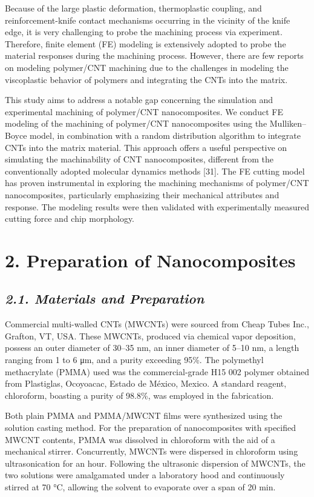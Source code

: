 \documentclass{article}
\begin{document}
Because of the large plastic deformation, thermoplastic coupling, and reinforcement-knife contact mechanisms occurring in the vicinity of the knife edge, it is very challenging to probe the machining process via experiment. Therefore, finite element (FE) modeling is extensively adopted to probe the material responses during the machining process. However, there are few reports on modeling polymer/CNT machining due to the challenges in modeling the viscoplastic behavior of polymers and integrating the CNTs into the matrix.

This study aims to address a notable gap concerning the simulation and experimental machining of polymer/CNT nanocomposites. We conduct FE modeling of the machining of polymer/CNT nanocomposites using the Mulliken–Boyce model, in combination with a random distribution algorithm to integrate CNTs into the matrix material. This approach offers a useful perspective on simulating the machinability of CNT nanocomposites, different from the conventionally adopted molecular dynamics methods [31]. The FE cutting model has proven instrumental in exploring the machining mechanisms of polymer/CNT nanocomposites, particularly emphasizing their mechanical attributes and response. The modeling results were then validated with experimentally measured cutting force and chip morphology.

\section*{2. Preparation of Nanocomposites}

\subsection*{\emph{2.1. Materials and Preparation}}

Commercial multi-walled CNTs (MWCNTs) were sourced from Cheap Tubes Inc., Grafton, VT, USA. These MWCNTs, produced via chemical vapor deposition, possess an outer diameter of 30–35 nm, an inner diameter of 5–10 nm, a length ranging from 1 to 6 μm, and a purity exceeding 95\%. The polymethyl methacrylate (PMMA) used was the commercial-grade H15 002 polymer obtained from Plastiglas, Ocoyoacac, Estado de México, Mexico. A standard reagent, chloroform, boasting a purity of 98.8\%, was employed in the fabrication.

Both plain PMMA and PMMA/MWCNT films were synthesized using the solution casting method. For the preparation of nanocomposites with specified MWCNT contents, PMMA was dissolved in chloroform with the aid of a mechanical stirrer. Concurrently, MWCNTs were dispersed in chloroform using ultrasonication for an hour. Following the ultrasonic dispersion of MWCNTs, the two solutions were amalgamated under a laboratory hood and continuously stirred at 70 °C, allowing the solvent to evaporate over a span of 20 min.
\end{document}
